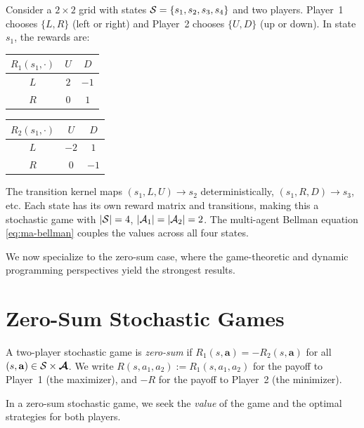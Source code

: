 \documentclass[11pt,a4paper]{article}
\begin{document}
\begin{example}
\label{ex:grid-world-sg}
Consider a $2 \times 2$ grid with states $\mathcal{S} = \{s_1, s_2,
s_3, s_4\}$ and two players.  Player~1 chooses $\{L, R\}$ (left or
right) and Player~2 chooses $\{U, D\}$ (up or down).  In state
$s_1$, the rewards are:
\begin{center}
\begin{tabular}{c|cc}
  $R_1(s_1, \cdot)$ & $U$ & $D$ \\ \hline
  $L$ & $2$ & $-1$ \\
  $R$ & $0$ & $1$
\end{tabular}
\quad\quad
\begin{tabular}{c|cc}
  $R_2(s_1, \cdot)$ & $U$ & $D$ \\ \hline
  $L$ & $-2$ & $1$ \\
  $R$ & $0$ & $-1$
\end{tabular}
\end{center}
The transition kernel maps $(s_1, L, U) \to s_2$ deterministically,
$(s_1, R, D) \to s_3$, etc.  Each state has its own reward matrix
and transitions, making this a stochastic game with $|\mathcal{S}| = 4$,
$|\mathcal{A}_1| = |\mathcal{A}_2| = 2$.  The multi-agent Bellman equation
\eqref{eq:ma-bellman} couples the values across all four states.
\end{example}

We now specialize to the zero-sum case, where the game-theoretic
and dynamic programming perspectives yield the strongest results.

\section{Zero-Sum Stochastic Games}
\label{sec:zero-sum}

\begin{definition}
\label{def:zero-sum-sg}
A two-player stochastic game is \emph{zero-sum} if
$R_1(s, \mathbf{a}) = -R_2(s, \mathbf{a})$ for all
$(s, \mathbf{a}) \in \mathcal{S} \times \boldsymbol{\mathcal{A}}$.  We write
$R(s, a_1, a_2) := R_1(s, a_1, a_2)$ for the payoff to Player~1
(the maximizer), and $-R$ for the payoff to Player~2 (the minimizer).
\end{definition}

In a zero-sum stochastic game, we seek the \emph{value} of the game
and the optimal strategies for both players.
\end{document}
